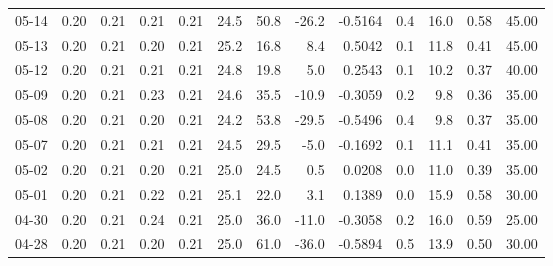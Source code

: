 \begin{threeparttable}
{\begin{tabular}{lrrrrrrrrrrrr}
  05-14 &          0.20 &          0.21 &          0.21 &        0.21 &                24.5 &                50.8 &      -26.2 &      -0.5164 &                 0.4 &             16.0 &            0.58 &                  45.00 \\
  05-13 &          0.20 &          0.21 &          0.20 &        0.21 &                25.2 &                16.8 &        8.4 &       0.5042 &                 0.1 &             11.8 &            0.41 &                  45.00 \\
  05-12 &          0.20 &          0.21 &          0.21 &        0.21 &                24.8 &                19.8 &        5.0 &       0.2543 &                 0.1 &             10.2 &            0.37 &                  40.00 \\
  05-09 &          0.20 &          0.21 &          0.23 &        0.21 &                24.6 &                35.5 &      -10.9 &      -0.3059 &                 0.2 &              9.8 &            0.36 &                  35.00 \\
  05-08 &          0.20 &          0.21 &          0.20 &        0.21 &                24.2 &                53.8 &      -29.5 &      -0.5496 &                 0.4 &              9.8 &            0.37 &                  35.00 \\
  05-07 &          0.20 &          0.21 &          0.21 &        0.21 &                24.5 &                29.5 &       -5.0 &      -0.1692 &                 0.1 &             11.1 &            0.41 &                  35.00 \\
  05-02 &          0.20 &          0.21 &          0.20 &        0.21 &                25.0 &                24.5 &        0.5 &       0.0208 &                 0.0 &             11.0 &            0.39 &                  35.00 \\
  05-01 &          0.20 &          0.21 &          0.22 &        0.21 &                25.1 &                22.0 &        3.1 &       0.1389 &                 0.0 &             15.9 &            0.58 &                  30.00 \\
  04-30 &          0.20 &          0.21 &          0.24 &        0.21 &                25.0 &                36.0 &      -11.0 &      -0.3058 &                 0.2 &             16.0 &            0.59 &                  25.00 \\
  04-28 &          0.20 &          0.21 &          0.20 &        0.21 &                25.0 &                61.0 &      -36.0 &      -0.5894 &                 0.5 &             13.9 &            0.50 &                  30.00 \\

\end{tabular}}
\end{threeparttable}

